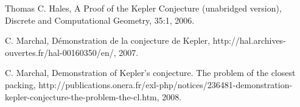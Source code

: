 

\backmatter


\begin{thebibliography}{CHMS94}

 Thomas C. Hales, A Proof of the
Kepler Conjecture (unabridged version), 
Discrete and Computational Geometry, 35:1, 2006.

 C. Marchal, D\'emonstration de la conjecture de Kepler,
http://hal.archives-ouvertes.fr/hal-00160350/en/, 2007.

 C. Marchal, Demonstration of Kepler's conjecture. The problem of the closest packing, http://publications.onera.fr/exl-php/notices/236481-demonstration-kepler-conjecture-the-problem-the-cl.htm, 2008.

\end{thebibliography}



